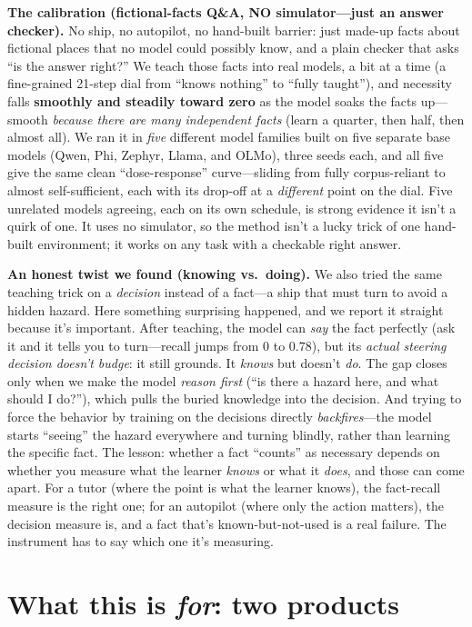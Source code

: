 \documentclass[11pt]{article}
\begin{document}
\textbf{The calibration (fictional-facts Q\&A, NO simulator---just an answer checker).} No ship,
no autopilot, no hand-built barrier: just made-up facts about fictional places that no model could
possibly know, and a plain checker that asks ``is the answer right?'' We teach those facts into
real models, a bit at a time (a fine-grained 21-step dial from ``knows nothing'' to ``fully taught''),
and necessity falls \textbf{smoothly and steadily toward zero} as the model soaks the facts up---smooth
\emph{because there are many independent facts} (learn a quarter, then half, then almost all). We ran
it in \emph{five} different model families built on five separate base models (Qwen, Phi, Zephyr,
Llama, and OLMo), three seeds each, and all five give the same clean ``dose-response'' curve---sliding from fully
corpus-reliant to almost self-sufficient, each with its drop-off at a \emph{different} point on the
dial. Five unrelated models agreeing, each on its own schedule, is strong evidence it isn't a quirk of
one. It uses no
simulator, so the method isn't a lucky trick of one hand-built environment; it works on any task with
a checkable right answer.

\textbf{An honest twist we found (knowing vs.\ doing).} We also tried the same teaching trick on a
\emph{decision} instead of a fact---a ship that must turn to avoid a hidden hazard. Here something
surprising happened, and we report it straight because it's important. After teaching, the model
can \emph{say} the fact perfectly (ask it and it tells you to turn---recall jumps from $0$ to
$0.78$), but its \emph{actual steering decision doesn't budge}: it still grounds. It \emph{knows}
but doesn't \emph{do}. The gap closes only when we make the model \emph{reason first} (``is there a
hazard here, and what should I do?''), which pulls the buried knowledge into the decision. And
trying to force the behavior by training on the decisions directly \emph{backfires}---the model
starts ``seeing'' the hazard everywhere and turning blindly, rather than learning the specific
fact. The lesson: whether a fact ``counts'' as necessary depends on whether you measure what the
learner \emph{knows} or what it \emph{does}, and those can come apart. For a tutor (where the point
is what the learner knows), the fact-recall measure is the right one; for an autopilot (where only
the action matters), the decision measure is, and a fact that's known-but-not-used is a real
failure. The instrument has to say which one it's measuring.

\section*{What this is \emph{for}: two products}
\end{document}
